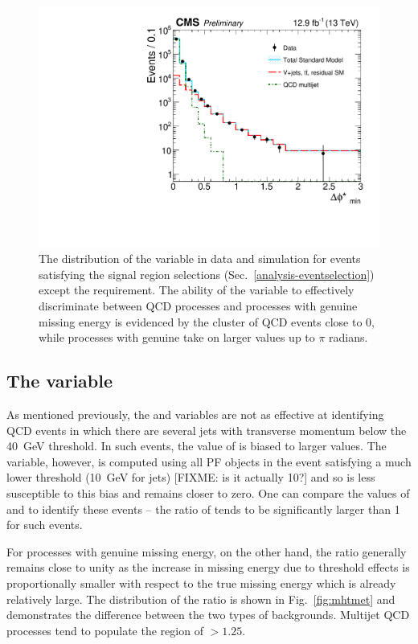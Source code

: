 
\begin{figure}
\begin{center}
\includegraphics[width=0.7\linewidth]{figs/analysis/propaganda_bdphi}
\caption{The distribution of the \bdphi variable in data and simulation for 
events satisfying the signal region selections 
(Sec.~\ref{analysis-eventselection}) except the \bdphi requirement. The ability 
of the variable to effectively discriminate between QCD processes and processes 
with genuine missing energy is evidenced by the cluster of QCD events close to 
0, while processes with genuine \met take on larger values up to $\pi$ radians.}
\label{fig:bdphi}
\end{center}
\end{figure}

\subsection{The \mhtmet variable}

As mentioned previously, the \alphat and \bdphi variables are not as effective 
at identifying QCD events in which there are several jets with transverse 
momentum below the 40~GeV threshold. In such events, the value of \mht is 
biased to larger values. The \met variable, however, is computed using all PF 
objects in the event satisfying a much lower threshold (10~GeV for jets) 
[FIXME: is it actually 10?] and so is less susceptible to this bias and remains 
closer to zero. One can compare the values of \mht and \met to identify these 
events -- the ratio of \mhtmet tends to be significantly larger than 1 for such 
events. 

For processes with genuine missing energy, on the other hand, the ratio 
generally remains close to unity as the increase in missing energy due to 
threshold effects is proportionally smaller with respect to the true missing 
energy which is already relatively large. The distribution of the \mhtmet 
ratio is shown in Fig.~\ref{fig:mhtmet} and demonstrates the difference between 
the two types of backgrounds. Multijet QCD processes tend to populate the 
region of \mhtmet$>1.25$.

